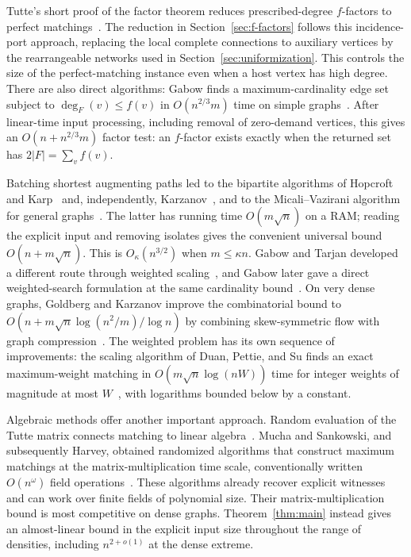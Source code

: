 Tutte's short proof of the factor theorem reduces prescribed-degree
$f$-factors to perfect matchings~\cite{Tutte1954Factor}. The reduction in
Section~\ref{sec:f-factors} follows this incidence-port approach, replacing
the local complete connections to auxiliary vertices by the rearrangeable
networks used in Section~\ref{sec:uniformization}. This controls the size of
the perfect-matching instance even when a host vertex has high degree.
There are also direct algorithms: Gabow finds a maximum-cardinality edge
set subject to $\deg_F(v)\le f(v)$ in $O(n^{2/3}m)$ time on simple
graphs~\cite[Theorem~4.1]{Gabow2025FMatching}. After linear-time input
processing, including removal of zero-demand vertices, this gives an
$O(n+n^{2/3}m)$ factor test: an $f$-factor exists exactly when the returned
set has $2|F|=\sum_v f(v)$.

Batching shortest augmenting paths led to the bipartite algorithms of
Hopcroft and Karp~\cite{HopcroftKarp1973} and, independently,
Karzanov~\cite{Karzanov1973Representatives}, and to the Micali--Vazirani
algorithm for general graphs~\cite{MicaliVazirani,MicaliVaziraniAnalysis}.
The latter has running time $O(m\sqrt n)$ on a RAM; reading the explicit
input and removing isolates gives the convenient universal bound
$O(n+m\sqrt n)$. This is $O_\kappa(n^{3/2})$ when $m\le\kappa n$.
Gabow and Tarjan developed a different route through weighted
scaling~\cite{GabowTarjan1991}, and Gabow later gave a direct
weighted-search formulation at the same cardinality bound~\cite{Gabow2017}.
On very dense graphs, Goldberg and Karzanov improve the combinatorial bound to
$O(n+m\sqrt n\log(n^2/m)/\log n)$ by combining skew-symmetric flow
with graph compression~\cite[Theorem~10.3]{GoldbergKarzanov2004}.
The weighted problem has its own sequence of improvements: the scaling
algorithm of Duan, Pettie, and Su finds an exact maximum-weight matching in
$O(m\sqrt n\log(nW))$ time for integer weights of magnitude at most
$W$~\cite{DuanPettieSu2018}, with logarithms bounded below by a constant.

Algebraic methods offer another important approach. Random evaluation
of the Tutte matrix connects matching to linear algebra~\cite{Lovasz1979}.
Mucha and Sankowski, and subsequently Harvey, obtained randomized
algorithms that construct maximum matchings at the matrix-multiplication
time scale, conventionally written $O(n^\omega)$
field operations~\cite{MuchaSankowski2004,Harvey2009}.
These algorithms already recover explicit witnesses and can work over
finite fields of polynomial size. Their matrix-multiplication bound is
most competitive on dense graphs. Theorem~\ref{thm:main} instead gives an
almost-linear bound in the explicit input size throughout the range of
densities, including $n^{2+o(1)}$ at the dense extreme.

